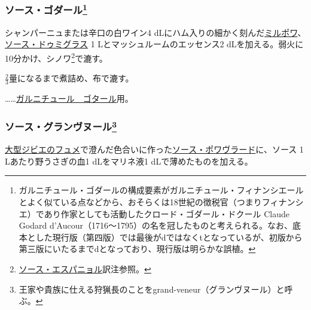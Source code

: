 \begin{recette}
\atoaki{}

\hypertarget{sauce-godard}{%
\subsubsection[ソース・ゴダール]{\texorpdfstring{ソース・ゴダール\footnote{ガルニチュール・ゴダールの構成要素がガルニチュール・フィナンシエールとよく似ている点などから、おそらくは18世紀の徴税官（つまりフィナンシエ）であり作家としても活動したクロード・ゴダール・ドクール
  Claude Godard
  d'Aucour（1716〜1795）の名を冠したものと考えられる。なお、底本とした現行版（第四版）では最後がdではなくtとなっているが、初版から第三版にいたるまでdとなっており、現行版は明らかな誤植。}}{ソース・ゴダール}}\label{sauce-godard}}


 

シャンパーニュまたは辛口の白ワイン4
dLにハム入りの細かく刻んだ\protect\hyperlink{mirepoix}{ミルポワ}、\protect\hyperlink{sauce-demi-glace}{ソース・ドゥミグラス}
1 Lとマッシュルームのエッセンス2
dLを加える。弱火に10分かけ、シノワ\footnote{\protect\hyperlink{sauce-espagnole}{ソース・エスパニョル}訳注参照。}で漉す。

\(\frac{2}{3}\)量になるまで煮詰め、布で漉す。

\ldots{}\ldots{}\protect\hyperlink{garniture-godard}{ガルニチュール　ゴタール}用。

\atoaki{}

\hypertarget{sauce-grand-veneur}{%
\subsubsection[ソース・グランヴヌール]{\texorpdfstring{ソース・グランヴヌール\footnote{王家や貴族に仕える狩猟長のことをgrand-veneur（グランヴヌール）と呼ぶ。}}{ソース・グランヴヌール}}\label{sauce-grand-veneur}}



\protect\hyperlink{fonds-de-gibier}{大型ジビエのフュメ}で澄んだ色合いに作った\protect\hyperlink{sauce-poivrade}{ソース・ポワヴラード}に、ソース
1 Lあたり野うさぎの血1 dLをマリネ液1 dLで薄めたものを加える。


\end{recette}
